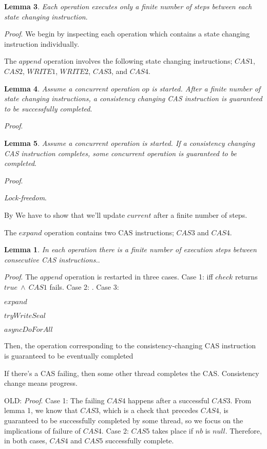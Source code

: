 \documentclass[runningheads,a4paper]{llncs}
\begin{document}
\textbf{Lemma 3}. \textit{Each operation executes only a finite number of steps
between each state changing instruction}.

\textit{Proof}. We begin by inspecting each operation which contains a state
changing instruction individually.

The \textbf{$append$} operation involves the following state changing
instructions; $CAS1$, $CAS2$, $WRITE1$, $WRITE2$, $CAS3$, and $CAS4$.

\textbf{Lemma 4}. \textit{Assume a concurrent operation $op$ is started. After
a finite number of state changing instructions, a consistency changing CAS
instruction is guaranteed to be successfully completed}.

\textit{Proof}. 

\textbf{Lemma 5}. \textit{Assume a concurrent operation is started. If a
consistency changing CAS instruction completes, some concurrent operation is
guaranteed to be completed}.

\textit{Proof}. 

\textit{Lock-freedom}. 



\pagebreak

By 
We have to show that we'll update $current$ after a finite number of steps.

The $expand$ operation contains two CAS instructions; $CAS3$
and $CAS4$.

\textbf{Lemma 1}. \textit{In each operation there is a finite number of execution steps between consecutive CAS instructions.}.

\textit{Proof}. The $append$ operation is restarted in three cases. Case 1: iff $check$ returns $true~\wedge~CAS1$ fails. Case 2: . Case 3: 

$expand$

$tryWriteSeal$

$asyncDoForAll$



Then, the
operation corresponding to the consistency-changing CAS instruction is
guaranteed to be  eventually completed

If there's a CAS failing, then some other thread completes the CAS. Consistency change means progress. 

OLD: \textit{Proof}. Case 1: The failing $CAS4$ happens after a successful $CAS3$. From lemma 1, we know that $CAS3$, which is a check that precedes $CAS4$, is guaranteed to be successfully completed by some thread, so we focus on the implications of failure of $CAS4$. Case 2: $CAS5$ takes place if $nb$ is $null$. Therefore, in both cases, $CAS4$ and $CAS5$ successfully complete.
\end{document}
